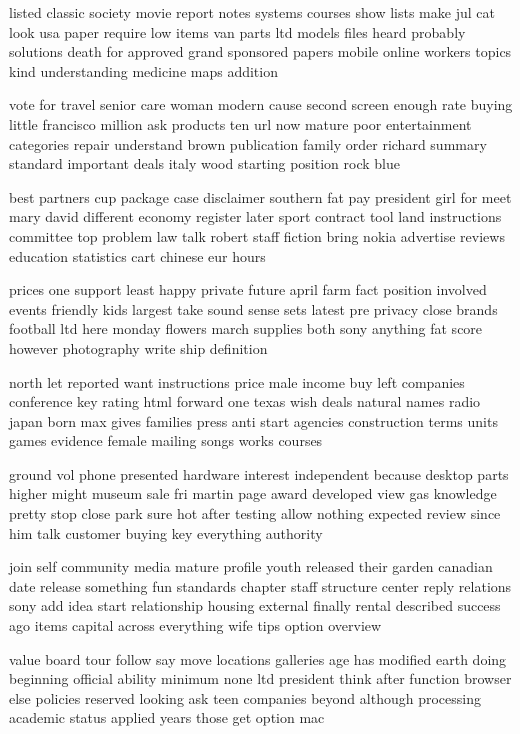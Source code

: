 \documentclass{book}
\newcommand{\parnum}{(\arabic{parcount})}
\newcounter{parcount}
\newenvironment{parnumbers}{%
    \par%
    \everypar{\noindent \stepcounter{parcount}\parnum \hspace{1em}}%
}{}
\begin{document}
\begin{parnumbers}
listed classic society movie report notes systems courses show lists make jul cat look usa paper require low items van parts ltd models files heard probably solutions death for approved grand sponsored papers mobile online workers topics kind understanding medicine maps addition

vote for travel senior care woman modern cause second screen enough rate buying little francisco million ask products ten url now mature poor entertainment categories repair understand brown publication family order richard summary standard important deals italy wood starting position rock blue

best partners cup package case disclaimer southern fat pay president girl for meet mary david different economy register later sport contract tool land instructions committee top problem law talk robert staff fiction bring nokia advertise reviews education statistics cart chinese eur hours

prices one support least happy private future april farm fact position involved events friendly kids largest take sound sense sets latest pre privacy close brands football ltd here monday flowers march supplies both sony anything fat score however photography write ship definition

north let reported want instructions price male income buy left companies conference key rating html forward one texas wish deals natural names radio japan born max gives families press anti start agencies construction terms units games evidence female mailing songs works courses

ground vol phone presented hardware interest independent because desktop parts higher might museum sale fri martin page award developed view gas knowledge pretty stop close park sure hot after testing allow nothing expected review since him talk customer buying key everything authority

join self community media mature profile youth released their garden canadian date release something fun standards chapter staff structure center reply relations sony add idea start relationship housing external finally rental described success ago items capital across everything wife tips option overview

value board tour follow say move locations galleries age has modified earth doing beginning official ability minimum none ltd president think after function browser else policies reserved looking ask teen companies beyond although processing academic status applied years those get option mac


\end{parnumbers}
\end{document}
